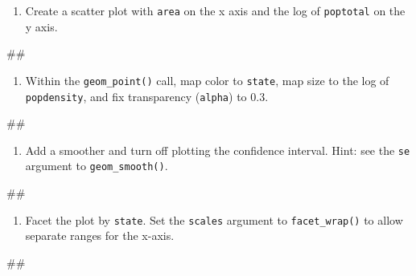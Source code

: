 \documentclass[]{book}
\newenvironment{Shaded}{\begin{snugshade}}{\end{snugshade}}
\newcommand{\NormalTok}[1]{#1}
\providecommand{\tightlist}{%
  \setlength{\itemsep}{0pt}\setlength{\parskip}{0pt}}
\begin{document}
\begin{enumerate}
\def\labelenumi{\arabic{enumi}.}
\tightlist
\item
  Create a scatter plot with \texttt{area} on the x axis and the log of
  \texttt{poptotal} on the y axis.
\end{enumerate}

\begin{Shaded}
\begin{Highlighting}[]
\NormalTok{## }
\end{Highlighting}
\end{Shaded}

\begin{enumerate}
\def\labelenumi{\arabic{enumi}.}
\setcounter{enumi}{1}
\tightlist
\item
  Within the \texttt{geom\_point()} call, map color to \texttt{state},
  map size to the log of \texttt{popdensity}, and fix transparency
  (\texttt{alpha}) to 0.3.
\end{enumerate}

\begin{Shaded}
\begin{Highlighting}[]
\NormalTok{## }
\end{Highlighting}
\end{Shaded}

\begin{enumerate}
\def\labelenumi{\arabic{enumi}.}
\setcounter{enumi}{2}
\tightlist
\item
  Add a smoother and turn off plotting the confidence interval. Hint:
  see the \texttt{se} argument to \texttt{geom\_smooth()}.
\end{enumerate}

\begin{Shaded}
\begin{Highlighting}[]
\NormalTok{## }
\end{Highlighting}
\end{Shaded}

\begin{enumerate}
\def\labelenumi{\arabic{enumi}.}
\setcounter{enumi}{3}
\tightlist
\item
  Facet the plot by \texttt{state}. Set the \texttt{scales} argument to
  \texttt{facet\_wrap()} to allow separate ranges for the x-axis.
\end{enumerate}

\begin{Shaded}
\begin{Highlighting}[]
\NormalTok{## }
\end{Highlighting}
\end{Shaded}
\end{document}
